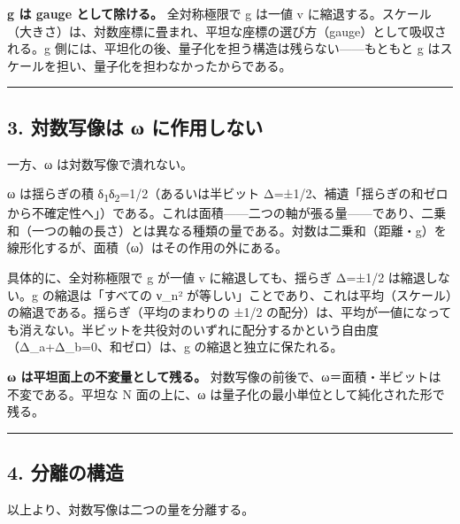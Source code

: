 \documentclass[11pt]{ltjsarticle}
\begin{document}
\textbf{g は gauge として除ける。} 全対称極限で g は一値 v
に縮退する。スケール（大きさ）は、対数座標に畳まれ、平坦な座標の選び方（gauge）として吸収される。g
側には、平坦化の後、量子化を担う構造は残らない------もともと g
はスケールを担い、量子化を担わなかったからである。

\begin{center}\rule{0.5\linewidth}{0.5pt}\end{center}

\subsection{3. 対数写像は ω
に作用しない}\label{ux5bfeux6570ux5199ux50cfux306f-ux3c9-ux306bux4f5cux7528ux3057ux306aux3044}

一方、ω は対数写像で潰れない。

ω は揺らぎの積 δ\textsubscript{1}δ\textsubscript{2}=1/2（あるいは半ビット
Δ=±1/2、補遺「揺らぎの和ゼロから不確定性へ」）である。これは面積------二つの軸が張る量------であり、二乗和（一つの軸の長さ）とは異なる種類の量である。対数は二乗和（距離・g）を線形化するが、面積（ω）はその作用の外にある。

具体的に、全対称極限で g が一値 v に縮退しても、揺らぎ Δ=±1/2
は縮退しない。g の縮退は「すべての ν\_n²
が等しい」ことであり、これは平均（スケール）の縮退である。揺らぎ（平均のまわりの
±1/2
の配分）は、平均が一値になっても消えない。半ビットを共役対のいずれに配分するかという自由度（Δ\_a+Δ\_b=0、和ゼロ）は、g
の縮退と独立に保たれる。

\textbf{ω は平坦面上の不変量として残る。}
対数写像の前後で、ω＝面積・半ビットは不変である。平坦な N 面の上に、ω
は量子化の最小単位として純化された形で残る。

\begin{center}\rule{0.5\linewidth}{0.5pt}\end{center}

\subsection{4. 分離の構造}\label{ux5206ux96e2ux306eux69cbux9020}

以上より、対数写像は二つの量を分離する。
\end{document}
